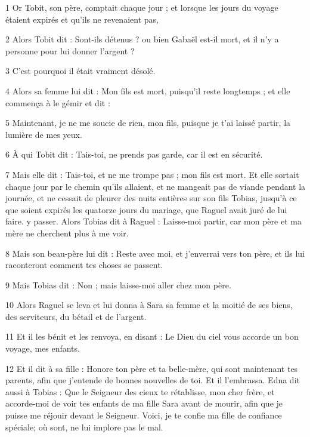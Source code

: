 \par 1 Or Tobit, son père, comptait chaque jour ; et lorsque les jours du voyage étaient expirés et qu'ils ne revenaient pas,
\par 2 Alors Tobit dit : Sont-ils détenus ? ou bien Gabaël est-il mort, et il n'y a personne pour lui donner l'argent ?
\par 3 C'est pourquoi il était vraiment désolé.
\par 4 Alors sa femme lui dit : Mon fils est mort, puisqu'il reste longtemps ; et elle commença à le gémir et dit :
\par 5 Maintenant, je ne me soucie de rien, mon fils, puisque je t'ai laissé partir, la lumière de mes yeux.
\par 6 À qui Tobit dit : Tais-toi, ne prends pas garde, car il est en sécurité.
\par 7 Mais elle dit : Tais-toi, et ne me trompe pas ; mon fils est mort. Et elle sortait chaque jour par le chemin qu'ils allaient, et ne mangeait pas de viande pendant la journée, et ne cessait de pleurer des nuits entières sur son fils Tobias, jusqu'à ce que soient expirés les quatorze jours du mariage, que Raguel avait juré de lui faire. y passer. Alors Tobias dit à Raguel : Laisse-moi partir, car mon père et ma mère ne cherchent plus à me voir.
\par 8 Mais son beau-père lui dit : Reste avec moi, et j'enverrai vers ton père, et ils lui raconteront comment tes choses se passent.
\par 9 Mais Tobias dit : Non ; mais laisse-moi aller chez mon père.
\par 10 Alors Raguel se leva et lui donna à Sara sa femme et la moitié de ses biens, des serviteurs, du bétail et de l'argent.
\par 11 Et il les bénit et les renvoya, en disant : Le Dieu du ciel vous accorde un bon voyage, mes enfants.
\par 12 Et il dit à sa fille : Honore ton père et ta belle-mère, qui sont maintenant tes parents, afin que j'entende de bonnes nouvelles de toi. Et il l'embrassa. Edna dit aussi à Tobias : Que le Seigneur des cieux te rétablisse, mon cher frère, et accorde-moi de voir tes enfants de ma fille Sara avant de mourir, afin que je puisse me réjouir devant le Seigneur. Voici, je te confie ma fille de confiance spéciale; où sont, ne lui implore pas le mal.


